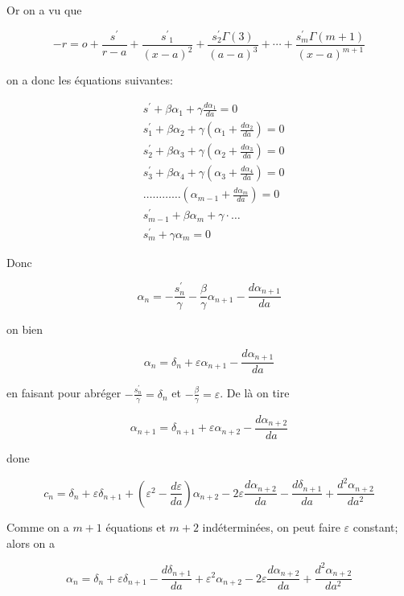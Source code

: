 \documentclass{article}
\begin{document}
Or on a vu que

\[
-r=o+\frac{s^{\prime}}{r-a}+\frac{s^{\prime}{ }_{1}}{(x-a)^{2}}+\frac{s_{2}^{\prime} \Gamma(3)}{(a-a)^{3}}+\cdots+\frac{s_{m}^{\prime} \Gamma(m+1)}{(x-a)^{m+1}}
\]

on a donc les équations suivantes:

\[
\begin{aligned}
& s^{\prime}+\beta \alpha_{1}+\gamma \frac{d \alpha_{1}}{d a}=0 \\
& s_{1}^{\prime}+\beta \alpha_{2}+\gamma\left(\alpha_{1}+\frac{d \alpha_{2}}{d a}\right)=0 \\
& s_{2}^{\prime}+\beta \alpha_{3}+\gamma\left(\alpha_{2}+\frac{d \alpha_{3}}{d a}\right)=0 \\
& s_{3}^{\prime}+\beta \alpha_{4}+\gamma\left(\alpha_{3}+\frac{d \alpha_{4}}{d a}\right)=0 \\
& \ldots \ldots \ldots \ldots\left(\alpha_{m-1}+\frac{d \alpha_{m}}{d a}\right)=0 \\
& s_{m-1}^{\prime}+\beta \alpha_{m}+\gamma \cdot \ldots \\
& s_{m}^{\prime}+\gamma \alpha_{m}=0
\end{aligned}
\]

Donc

\[
\alpha_{n}=-\frac{s_{n}^{\prime}}{\gamma}-\frac{\beta}{\gamma} \alpha_{n+1}-\frac{d \alpha_{n+1}}{d a}
\]

on bien

\[
\alpha_{n}=\delta_{n}+\varepsilon \alpha_{n+1}-\frac{d \alpha_{n+1}}{d a}
\]

en faisant pour abréger \(-\frac{s_{n}^{\prime}}{\gamma}=\delta_{n}\) et \(-\frac{\beta}{\gamma}=\varepsilon\). De là on tire

\[
\alpha_{n+1}=\delta_{n+1}+\varepsilon \alpha_{n+2}-\frac{d \alpha_{n+2}}{d a}
\]

done

\[
c_{n}=\delta_{n}+\varepsilon \delta_{n+1}+\left(\varepsilon^{2}-\frac{d \varepsilon}{d a}\right) \alpha_{n+2}-2 \varepsilon \frac{d \alpha_{n+2}}{d a}-\frac{d \delta_{n+1}}{d a}+\frac{d^{2} \alpha_{n+2}}{d a^{2}}
\]

Comme on a \(m+1\) équations et \(m+2\) indéterminées, on peut faire \(\varepsilon\) constant; alors on a

\[
\alpha_{n}=\delta_{n}+\varepsilon \delta_{n+1}-\frac{d \delta_{n+1}}{d a}+\varepsilon^{2} \alpha_{n+2}-2 \varepsilon \frac{d \alpha_{n+2}}{d a}+\frac{d^{2} \alpha_{n+2}}{d a^{2}}
\]
\end{document}
